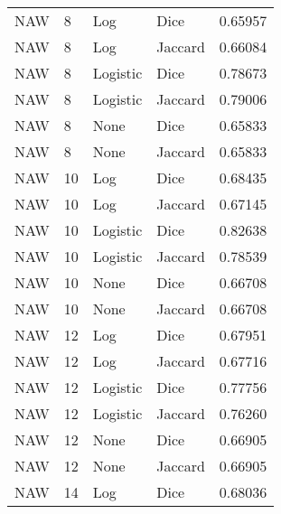 \documentclass{article}
\begin{document}
\begin{center}
	\scriptsize
    
    \tablelasttail{\hline}

      \begin{supertabular}{| l | l | l | l | l |}
            NAW & 8 & Log & Dice & 0.65957 \\
            NAW & 8 & Log & Jaccard & 0.66084 \\
            NAW & 8 & Logistic & Dice & 0.78673 \\
            NAW & 8 & Logistic & Jaccard & 0.79006 \\
            NAW & 8 & None & Dice & 0.65833 \\
            NAW & 8 & None & Jaccard & 0.65833 \\
            NAW & 10 & Log & Dice & 0.68435 \\
            NAW & 10 & Log & Jaccard & 0.67145 \\
            NAW & 10 & Logistic & Dice & 0.82638 \\
            NAW & 10 & Logistic & Jaccard & 0.78539 \\
            NAW & 10 & None & Dice & 0.66708 \\
            NAW & 10 & None & Jaccard & 0.66708 \\
            NAW & 12 & Log & Dice & 0.67951 \\
            NAW & 12 & Log & Jaccard & 0.67716 \\
            NAW & 12 & Logistic & Dice & 0.77756 \\
            NAW & 12 & Logistic & Jaccard & 0.76260 \\
            NAW & 12 & None & Dice & 0.66905 \\
            NAW & 12 & None & Jaccard & 0.66905 \\
            NAW & 14 & Log & Dice & 0.68036 \\

\end{supertabular}
\end{center}
\end{document}
